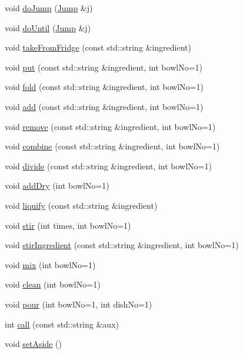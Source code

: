 \begin{DoxyCompactItemize}
\item 
void \hyperlink{group__Command_ga003607cfe3ab13de0bc6b85d659856bc}{do\-Jump} (\hyperlink{structJump}{Jump} \&j)
\item 
void \hyperlink{group__Command_gadad4684f1b60dbabd7ac9b8ac9816d32}{do\-Until} (\hyperlink{structJump}{Jump} \&j)
\item 
void \hyperlink{group__Command_gac3113fc72f93de181c7064c840fda35d}{take\-From\-Fridge} (const std\-::string \&ingredient)
\item 
void \hyperlink{group__Command_ga30b29697e66c0cd365a52f6ea0779081}{put} (const std\-::string \&ingredient, int bowl\-No=1)
\item 
void \hyperlink{group__Command_gac4b62604279d9c5b3547b431b8954ff7}{fold} (const std\-::string \&ingredient, int bowl\-No=1)
\item 
void \hyperlink{group__Command_gab16e0a2d2ea903340d8f4249301c4b4b}{add} (const std\-::string \&ingredient, int bowl\-No=1)
\item 
void \hyperlink{group__Command_gac6fb6dbdc7029c128dd3f1c9baf81db0}{remove} (const std\-::string \&ingredient, int bowl\-No=1)
\item 
void \hyperlink{group__Command_ga4ef5821d2d54f6370b120d2044396562}{combine} (const std\-::string \&ingredient, int bowl\-No=1)
\item 
void \hyperlink{group__Command_ga02cee3468892d727f827f7ad6e3d2f1d}{divide} (const std\-::string \&ingredient, int bowl\-No=1)
\item 
void \hyperlink{group__Command_ga7c657ea9ec19dfb55292a7474fe12511}{add\-Dry} (int bowl\-No=1)
\item 
void \hyperlink{group__Command_ga18eed9f7920c0a2b94a16f467b7faf1b}{liquify} (const std\-::string \&ingredient)
\item 
void \hyperlink{group__Command_ga5b48c67eb04fc71c199bdf611c387c9e}{stir} (int times, int bowl\-No=1)
\item 
void \hyperlink{group__Command_gaa27e4367ef81507d9e9308230cc44c0d}{stir\-Ingredient} (const std\-::string \&ingredient, int bowl\-No=1)
\item 
void \hyperlink{group__Command_gad9a02b3a48b606ba17dc91337c3f64c2}{mix} (int bowl\-No=1)
\item 
void \hyperlink{group__Command_gae041e0eb15d1e40fe513b53803810dac}{clean} (int bowl\-No=1)
\item 
void \hyperlink{group__Command_ga03848074a9e527439e6381e47d9f3749}{pour} (int bowl\-No=1, int dish\-No=1)
\item 
int \hyperlink{group__Command_gab7d94d3b379ae3f1ada2c010510c3b43}{call} (const std\-::string \&aux)
\item 
void \hyperlink{group__Command_ga4889710ccae668fb039e4dfa0ea2dae7}{set\-Aside} ()
\end{DoxyCompactItemize}
